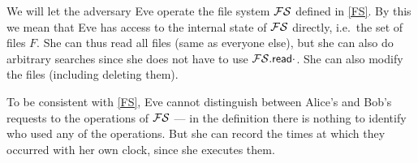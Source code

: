 We will let the adversary Eve operate the file system \(\FS\) defined in 
\cref{FS}.
By this we mean that Eve has access to the internal state of \(\FS\) directly, 
i.e.\ the set of files \(F\).
She can thus read all files (same as everyone else), but she can also do 
arbitrary searches since she does not have to use \(\fsread{\cdot}\).
She can also modify the files (including deleting them).

To be consistent with \cref{FS}, Eve cannot distinguish between Alice's and 
Bob's requests to the operations of \(\FS\) --- in the definition there is 
nothing to identify who used any of the operations.
But she can record the times at which they occurred with her own clock, since 
she executes them.


